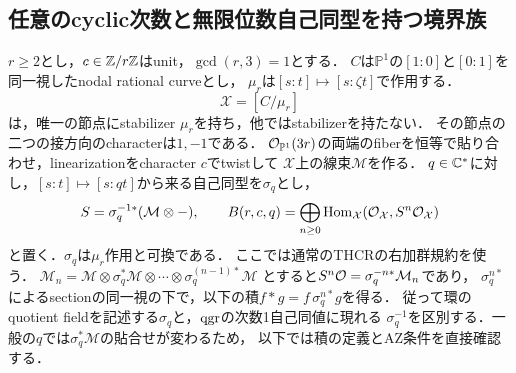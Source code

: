 \documentclass[11pt,a4paper]{ltjsarticle}
\begin{document}
\subsection{任意のcyclic次数と無限位数自己同型を持つ境界族}

$r\geq2$とし，$c\in\mathbb Z/r\mathbb Z$はunit，$\gcd(r,3)=1$とする．
$C$は$\mathbb P^1$の$[1:0]$と$[0:1]$を同一視したnodal rational curveとし，
$\mu_r$は$[s:t]\mapsto[s:\zeta t]$で作用する．
\[
 \mathcal X=[C/\mu_r]
\]
は，唯一の節点にstabilizer $\mu_r$を持ち，他ではstabilizerを持たない．
その節点の二つの接方向のcharacterは$1,-1$である．
$\mathcal O_{\mathbb P^1}(3r)$の両端のfiberを恒等で貼り合わせ，linearizationをcharacter $c$でtwistして
$\mathcal X$上の線束$\mathcal M$を作る．
$q\in\mathbb C^*$に対し，$[s:t]\mapsto[s:qt]$から来る自己同型を$\sigma_q$とし，
\[
 S=\sigma_q^{-1*}(\mathcal M\otimes-),\qquad
 B(r,c,q)=\bigoplus_{n\geq0}\operatorname{Hom}_{\mathcal X}(\mathcal O_{\mathcal X},S^n\mathcal O_{\mathcal X})
\]
と置く．$\sigma_q$は$\mu_r$作用と可換である．
ここでは通常のTHCRの右加群規約を使う．
$\mathcal M_n=\mathcal M\otimes\sigma_q^*\mathcal M\otimes\cdots\otimes\sigma_q^{(n-1)*}\mathcal M$
とすると$S^n\mathcal O=\sigma_q^{-n*}\mathcal M_n$であり，
$\sigma_q^{n*}$によるsectionの同一視の下で，以下の積$f*g=f\,\sigma_q^{n*}g$を得る．
従って環のquotient fieldを記述する$\sigma_q$と，$\operatorname{qgr}$の次数1自己同値に現れる
$\sigma_q^{-1}$を区別する．一般の$q$では$\sigma_q^*\mathcal M$の貼合せが変わるため，
以下では積の定義とAZ条件を直接確認する．
\end{document}
